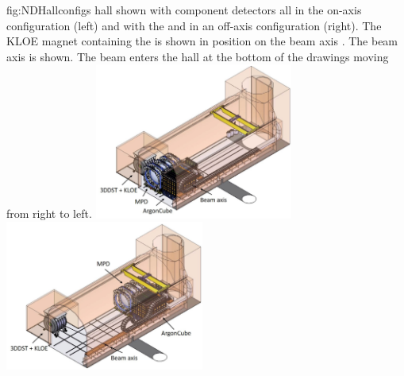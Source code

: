 \begin{dunefigure}{fig:NDHallconfigs}
{  hall shown with component detectors all in the on-axis configuration (left) and with the  and  in an off-axis configuration (right). The KLOE magnet containing the  is shown in position on the beam axis . The beam axis is shown.  The beam enters the hall at the bottom of the drawings moving from right to left.}
\includegraphics[width=0.49\textwidth]{graphics/NDHall_onaxis.jpg}
\includegraphics[width=0.49\textwidth]{graphics/NDHall_offaxis.jpg}
\end{dunefigure}



